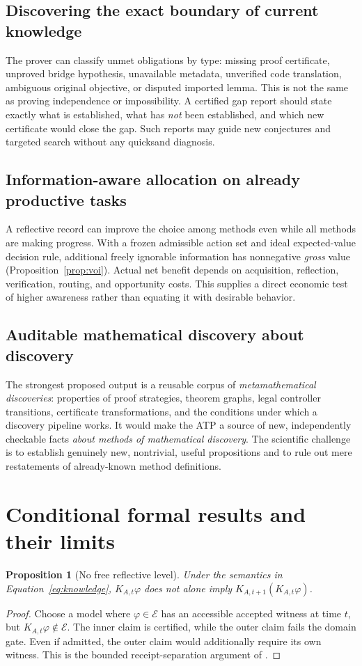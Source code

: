 \documentclass[11pt,letterpaper]{article}
\newtheorem{proposition}[definition]{Proposition}
\begin{document}
\subsection{Discovering the exact boundary of current knowledge}
The prover can classify unmet obligations by type: missing proof certificate, unproved bridge hypothesis, unavailable metadata, unverified code translation, ambiguous original objective, or disputed imported lemma. This is not the same as proving independence or impossibility. A certified gap report should state exactly what is established, what has \emph{not} been established, and which new certificate would close the gap. Such reports may guide new conjectures and targeted search without any quicksand diagnosis.

\subsection{Information-aware allocation on already productive tasks}
A reflective record can improve the choice among methods even while all methods are making progress. With a frozen admissible action set and ideal expected-value decision rule, additional freely ignorable information has nonnegative \emph{gross} value (Proposition~\ref{prop:voi}). Actual net benefit depends on acquisition, reflection, verification, routing, and opportunity costs. This supplies a direct economic test of higher awareness rather than equating it with desirable behavior.

\subsection{Auditable mathematical discovery about discovery}
The strongest proposed output is a reusable corpus of \emph{metamathematical discoveries}: properties of proof strategies, theorem graphs, legal controller transitions, certificate transformations, and the conditions under which a discovery pipeline works. It would make the ATP a source of new, independently checkable facts \emph{about methods of mathematical discovery}. The scientific challenge is to establish genuinely new, nontrivial, useful propositions and to rule out mere restatements of already-known method definitions.

\section{Conditional formal results and their limits}
\begin{proposition}[No free reflective level]\label{prop:nofree}
Under the semantics in Equation~\eqref{eq:knowledge}, $K_{A,t}\varphi$ does not alone imply $K_{A,t+1}(K_{A,t}\varphi)$.
\end{proposition}
\begin{proof}
Choose a model where $\varphi\in\mathcal E$ has an accessible accepted witness at time $t$, but $K_{A,t}\varphi\notin\mathcal E$. The inner claim is certified, while the outer claim fails the domain gate. Even if admitted, the outer claim would additionally require its own witness. This is the bounded receipt-separation argument of \cite{reflective}.
\end{proof}
\end{document}
